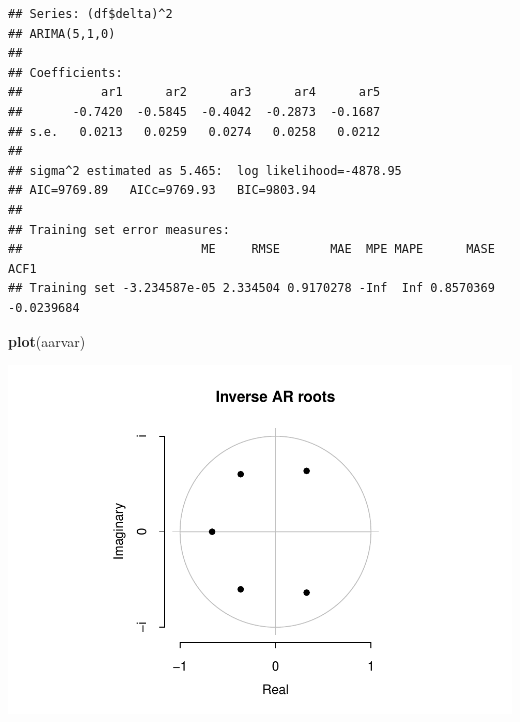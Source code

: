 \documentclass[11pt, a4paper]{report}
\newenvironment{Shaded}{\begin{snugshade}}{\end{snugshade}}
\newcommand{\KeywordTok}[1]{\textcolor[rgb]{0.13,0.29,0.53}{\textbf{#1}}}
\newcommand{\NormalTok}[1]{#1}
\newcommand{\OperatorTok}[1]{\textcolor[rgb]{0.81,0.36,0.00}{\textbf{#1}}}
\theoremstyle{plain}
\theoremstyle{plain}
\theoremstyle{remark}
\begin{document}
\begin{verbatim}
## Series: (df$delta)^2 
## ARIMA(5,1,0) 
## 
## Coefficients:
##           ar1      ar2      ar3      ar4      ar5
##       -0.7420  -0.5845  -0.4042  -0.2873  -0.1687
## s.e.   0.0213   0.0259   0.0274   0.0258   0.0212
## 
## sigma^2 estimated as 5.465:  log likelihood=-4878.95
## AIC=9769.89   AICc=9769.93   BIC=9803.94
## 
## Training set error measures:
##                         ME     RMSE       MAE  MPE MAPE      MASE       ACF1
## Training set -3.234587e-05 2.334504 0.9170278 -Inf  Inf 0.8570369 -0.0239684
\end{verbatim}

\begin{Shaded}
\begin{Highlighting}[]
\KeywordTok{plot}\NormalTok{(aarvar)}
\end{Highlighting}
\end{Shaded}

\begin{center}\includegraphics{Econo2_P1_files/figure-latex/auto arima-11} \end{center}

\begin{Shaded}
\end{Shaded}
\end{document}
